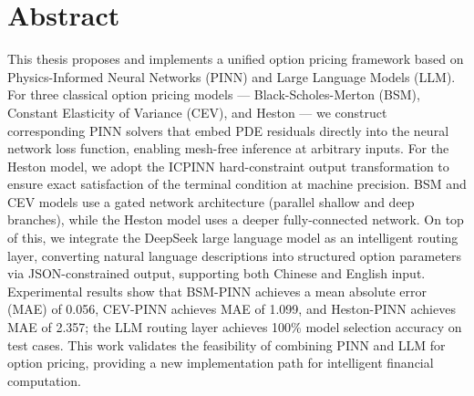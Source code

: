 \chapter*{Abstract}%

This thesis proposes and implements a unified option pricing framework based on Physics-Informed Neural Networks (PINN) and Large Language Models (LLM). For three classical option pricing models — Black-Scholes-Merton (BSM), Constant Elasticity of Variance (CEV), and Heston — we construct corresponding PINN solvers that embed PDE residuals directly into the neural network loss function, enabling mesh-free inference at arbitrary inputs. For the Heston model, we adopt the ICPINN hard-constraint output transformation to ensure exact satisfaction of the terminal condition at machine precision. BSM and CEV models use a gated network architecture (parallel shallow and deep branches), while the Heston model uses a deeper fully-connected network. On top of this, we integrate the DeepSeek large language model as an intelligent routing layer, converting natural language descriptions into structured option parameters via JSON-constrained output, supporting both Chinese and English input. Experimental results show that BSM-PINN achieves a mean absolute error (MAE) of 0.056, CEV-PINN achieves MAE of 1.099, and Heston-PINN achieves MAE of 2.357; the LLM routing layer achieves 100\% model selection accuracy on test cases. This work validates the feasibility of combining PINN and LLM for option pricing, providing a new implementation path for intelligent financial computation.

